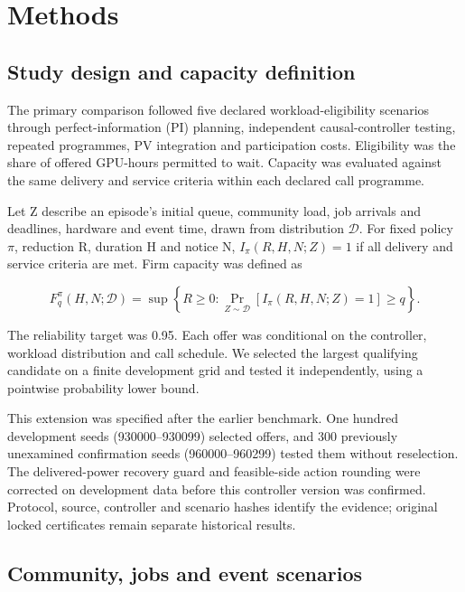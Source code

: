 \documentclass[10pt,a4paper]{article}
\begin{document}
\section*{Methods}

\subsection*{Study design and capacity definition}

The primary comparison followed five declared workload-eligibility scenarios through perfect-information (PI) planning, independent causal-controller testing, repeated programmes, PV integration and participation costs. Eligibility was the share of offered GPU-hours permitted to wait. Capacity was evaluated against the same delivery and service criteria within each declared call programme.


Let Z describe an episode's initial queue, community load, job arrivals and deadlines, hardware and event time, drawn from distribution \(\mathcal D\). For fixed policy \(\pi\), reduction R, duration H and notice N, \(I_\pi(R,H,N;Z)=1\) if all delivery and service criteria are met. Firm capacity was defined as


\begin{equation*}
F_q^{\pi}(H,N;\mathcal D)=
\sup\left\{R\geq0:\Pr_{Z\sim\mathcal D}
\left[I_\pi(R,H,N;Z)=1\right]\geq q\right\}.
\end{equation*}

The reliability target was 0.95. Each offer was conditional on the controller, workload distribution and call schedule. We selected the largest qualifying candidate on a finite development grid and tested it independently, using a pointwise probability lower bound.


This extension was specified after the earlier benchmark. One hundred development seeds (930000–930099) selected offers, and 300 previously unexamined confirmation seeds (960000–960299) tested them without reselection. The delivered-power recovery guard and feasible-side action rounding were corrected on development data before this controller version was confirmed. Protocol, source, controller and scenario hashes identify the evidence; original locked certificates remain separate historical results.


\subsection*{Community, jobs and event scenarios}
\end{document}
